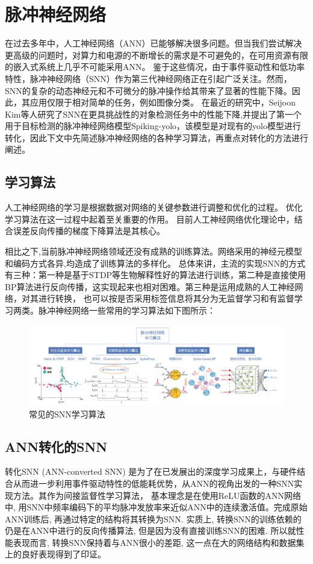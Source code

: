 \chapter{脉冲神经网络}
\par
在过去多年中，人工神经网络（ANN）已能够解决很多问题。但当我们尝试解决更高级的问题时，对算力和电源的不断增长的需求是不可避免的，在可用资源有限的嵌入式系统上几乎不可能采用ANN。
鉴于这些情况，由于事件驱动性和低功率特性，脉冲神经网络（SNN）作为第三代神经网络正在引起广泛关注。然而，SNN的复杂的动态神经元和不可微分的脉冲操作给其带来了显著的性能下降。因此，其应用仅限于相对简单的任务，例如图像分类。
在最近的研究中，Seijoon Kim等人研究了SNN在更具挑战性的对象检测任务中的性能下降,并提出了第一个用于目标检测的脉冲神经网络模型Spiking-yolo，该模型是对现有的yolo模型进行转化，因此下文中先简述脉冲神经网络的各种学习算法，再重点对转化的方法进行阐述。
\section{学习算法}
\par
人工神经网络的学习是根据数据对网络的关键参数进行调整和优化的过程。
优化学习算法在这一过程中起着至关重要的作用。
目前人工神经网络优化理论中，结合误差反向传播的梯度下降算法是其核心。
\par
相比之下,当前脉冲神经网络领域还没有成熟的训练算法。网络采用的神经元模型和编码方式各异,均造成了训练算法的多样化。
总体来讲，主流的实现SNN的方式有三种：第一种是基于STDP等生物解释性好的算法进行训练，第二种是直接使用BP算法进行反向传播，这实现起来也相对困难。第三种是运用成熟的人工神经网络，对其进行转换，
也可以按是否采用标签信息将其分为无监督学习和有监督学习两类。脉冲神经网络一些常用的学习算法如下图所示：
\begin{figure}[htbp]
	\centering
	\setlength{\abovecaptionskip}{0cm}  
	\setlength{\belowcaptionskip}{0cm}
	\includegraphics[width=1\textwidth]{figures/study.png}
	\caption{常见的SNN学习算法}
\end{figure}
\section{ANN转化的SNN}
\par
转化SNN (ANN-converted SNN) 是为了在已发展出的深度学习成果上，与硬件结合从而进一步利用事件驱动特性的低能耗优势，从ANN的视角出发的一种SNN实现方法。其作为间接监督性学习算法，
基本理念是在使用ReLU函数的ANN网络中, 用SNN中频率编码下的平均脉冲发放率来近似ANN中的连续激活值。完成原始ANN训练后, 再通过特定的结构将其转换为SNN. 
实质上, 转换SNN的训练依赖的仍是在ANN中进行的反向传播算法, 但是因为没有直接训练SNN的困难. 所以就性能表现而言, 转换SNN保持着与ANN很小的差距, 这一点在大的网络结构和数据集上的良好表现得到了印证。
